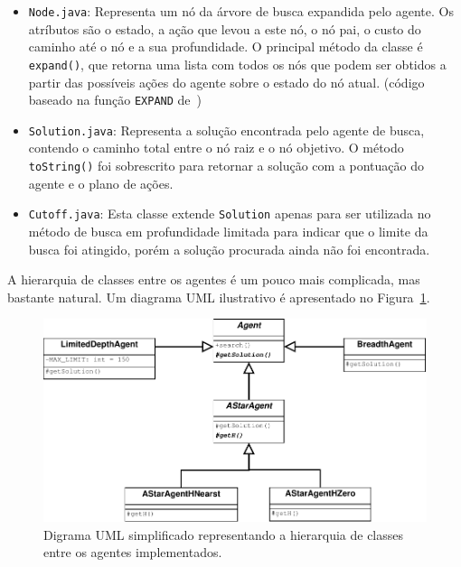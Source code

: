 \documentclass[12pt,a4paper]{article}
\begin{document}
\begin{itemize}
  \item{\verb|Node.java|}: Representa um nó da árvore de busca expandida pelo agente. Os atríbutos
  são o estado, a ação que levou a este nó, o nó pai, o custo do caminho até o nó e a sua 
  profundidade. O principal método da classe é \verb|expand()|, que retorna uma lista com todos os 
  nós que podem ser obtidos a partir das possíveis ações do agente sobre o estado do nó atual.
  (código baseado na função \verb|EXPAND| de~\cite{aima})
  
  \item{\verb|Solution.java|}: Representa a solução encontrada pelo agente de busca, contendo
  o caminho total entre o nó raiz e o nó objetivo. O método \verb|toString()| foi sobrescrito para
  retornar a solução com a pontuação do agente e o plano de ações.

  \item{\verb|Cutoff.java|}: Esta classe extende \verb|Solution| apenas para ser utilizada no método
  de busca em profundidade limitada para indicar que o limite da busca foi atingido, porém a solução 
  procurada ainda não foi encontrada.

\end{itemize}

A hierarquia de classes entre os agentes é um pouco mais complicada, mas bastante natural. Um 
diagrama UML ilustrativo é apresentado no Figura~\ref{fig:uml}.
%
\begin{figure}[htbp]
  \label{fig:uml}
  \begin{center}
    \includegraphics[scale=0.75]{uml.pdf}
    \caption{Digrama UML simplificado representando a hierarquia de classes entre os agentes 
    implementados.}
  \end{center}
\end{figure}

\end{document}
